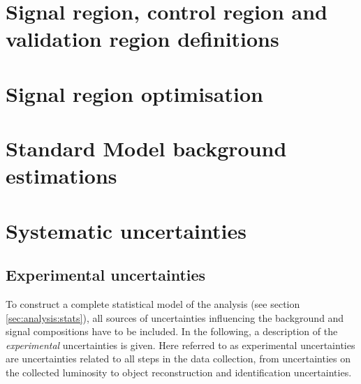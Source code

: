 \section{Signal region, control region and validation region definitions}
\label{sec:analysis:srcrvr}


\section{Signal region optimisation}
\label{sec:analysis:sroptimisationSection}

\label{sec:analysis:sroptimisation}

%
\FloatBarrier
\section{Standard Model background estimations}
\label{sec:analysis:bkgestimation}



\section{Systematic uncertainties}
\label{sec:analysis:systematics}
\subsection{Experimental uncertainties}
To construct a complete statistical model of the analysis (see section \ref{sec:analysis:stats}),  all sources of uncertainties influencing the background and signal compositions have to be included.
In the following,  a description of the \textit{experimental} uncertainties is given. Here referred to as experimental uncertainties are uncertainties related to all steps in the data collection,  from uncertainties on the collected luminosity to object reconstruction and identification uncertainties. 

